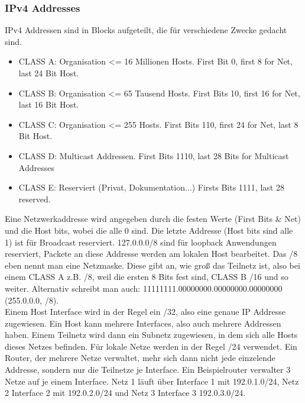 		\subsubsection{IPv4 Addresses}
			IPv4 Addressen sind in Blocks aufgeteilt, die für verschiedene Zwecke gedacht sind. 
			\begin{itemize}
				\item CLASS A: Organisation <= 16 Millionen Hosts. First Bit 0, first 8 for Net, last 24 Bit Host.
				\item CLASS B: Organisation <= 65 Tausend Hosts. First Bits 10, first 16 for Net, last 16 Bit Host.
				\item CLASS C: Organisation <= 255 Hosts. First Bits 110, first 24 for Net, last 8 Bit Host.
				\item CLASS D: Multicast Addressen. First Bits 1110, last 28 Bits for Multicast Addresses
				\item CLASS E: Reserviert (Privat, Dokumentation...) Firsts Bits 1111, last 28 reserved. 
			\end{itemize}
			Eine Netzwerkaddresse wird angegeben durch die festen Werte (First Bits \& Net) und die Host bits, wobei die alle 0 sind. Die letzte Addresse (Host bits sind alle 1) ist für Broadcast reserviert. 127.0.0.0/8 sind für loopback Anwendungen reserviert, Packete an diese Addresse werden am lokalen Host bearbeitet. Das /8 eben nennt man eine Netzmaske. Diese gibt an, wie groß das Teilnetz ist, also bei einem CLASS A z.B. /8, weil die ersten 8 Bits fest sind, CLASS B /16 und so weiter. Alternativ schreibt man auch: 11111111.00000000.00000000.00000000 (255.0.0.0, /8). \\
			Einem Host Interface wird in der Regel ein /32, also eine genaue IP Addresse zugewiesen. Ein Host kann mehrere Interfaces, also auch mehrere Addressen haben. Einem Teilnetz wird dann ein Subnetz zugewiesen, in dem sich alle Hosts dieses Netzes befinden. Für lokale Netze werden in der Regel /24 verwendet. Ein Router, der mehrere Netze verwaltet, mehr sich dann nicht jede einzelende Addresse, sondern nur die Teilnetze je Interface. Ein Beispielrouter verwalter 3 Netze auf je einem Interface. Netz 1 läuft über Interface 1 mit 192.0.1.0/24, Netz 2 Interface 2 mit 192.0.2.0/24 und Netz 3 Interface 3 192.0.3.0/24. 
